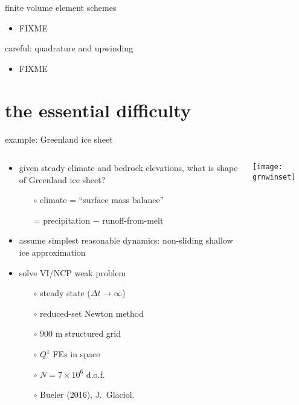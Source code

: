 \documentclass{beamer}
\begin{document}
\begin{frame}{finite volume element schemes}

\begin{itemize}
\item FIXME
\end{itemize}

\end{frame}


\begin{frame}{careful: quadrature and upwinding}

\begin{itemize}
\item FIXME
\end{itemize}

\end{frame}


\section{the essential difficulty} %

\begin{frame}{example: Greenland ice sheet}

\begin{columns}
\begin{column}{0.6\textwidth}
\begin{itemize}
\small
\item given steady climate and bedrock elevations, what is shape of Greenland ice sheet?
  \begin{itemize}
  \scriptsize
  \item[$\circ$] climate = ``surface mass balance''
  \item[] \qquad = precipitation $-$ runoff-from-melt
  \end{itemize}
\small
\item assume simplest reasonable dynamics: non-sliding shallow ice approximation
\item solve VI/NCP weak problem
  \begin{itemize}
  \scriptsize
  \item[$\circ$] steady state ($\Delta t\to \infty$)
  \item[$\circ$] reduced-set Newton method
  \item[$\circ$] 900 m structured grid
  \item[$\circ$] $Q^1$ FEs in space
  \item[$\circ$] $N=7\times 10^6$ d.o.f.
  \item[$\circ$] Bueler (2016), J.~Glaciol.
  \end{itemize}
\end{itemize}
\end{column}
\begin{column}{0.4\textwidth}
\vspace{-5mm}

\begin{center}
\texttt{[image: grnwinset]}
\end{center}
\end{column}
\end{columns}
\end{frame}
\end{document}
